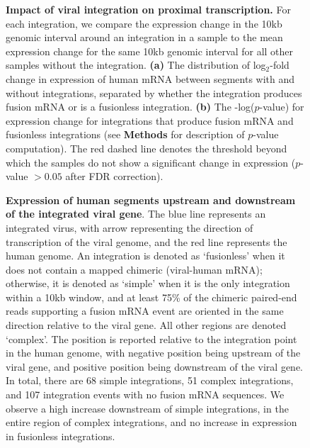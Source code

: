 \documentclass{bmcart}
\def\texttt{[image: ]}
\begin{document}
\begin{backmatter}
\begin{figure}[htpb] \centering
  \caption[Log$_2$-fold change of expression between genomic segments with
  and without integrations.]  {\label{figure_3} {\bf
        Impact of viral integration on proximal transcription.}  For each integration, we compare the expression change in the 10kb genomic interval around an integration in a sample to the mean expression change for the same 10kb genomic interval for all other samples without the integration.  \textbf{(a)}  The distribution of log$_2$-fold change in expression of human mRNA between segments with and without integrations, separated by whether the integration produces fusion mRNA or is a fusionless integration.  \textbf{(b)} The -log($p$-value) for
  expression change for integrations that produce fusion mRNA and fusionless integrations (see \textbf{Methods} for description of $p$-value computation).  The red dashed line denotes the threshold beyond which the samples do not show a significant change in expression ($p$-value $>0.05$ after FDR correction).}
\end{figure}

\begin{figure}[htpb] \centering
  \caption[Fusion reads supp.]  {\label{updown} {\small {\bf
        Expression of human segments upstream and downstream of the
        integrated viral gene}. The blue line represents
        an integrated virus, with arrow representing the direction of transcription
        of the viral genome, and the red line represents the human genome.  An integration is denoted as
      `fusionless' when it does not contain a mapped chimeric
      (viral-human mRNA); otherwise, it is denoted as `simple' when it
      is the only integration within a 10kb window, and at least 75\%
      of the chimeric paired-end reads supporting a fusion mRNA event
      are oriented in the same direction relative to the viral
      gene. All other regions are denoted `complex'. The position is
      reported relative to the integration point in the human genome,
      with negative position being upstream of the viral gene, and
      positive position being downstream of the viral gene. In total,
      there are 68 simple integrations, 51 complex integrations, and
      107 integration events with no fusion mRNA sequences. We observe
      a high increase downstream of simple integrations, in the entire
      region of complex integrations, and no increase in expression in
      fusionless integrations.}} %
\end{figure}


\end{backmatter}
\end{document}
